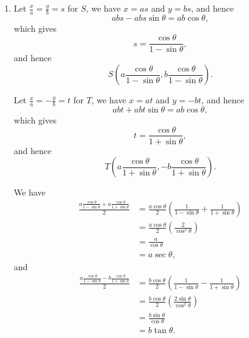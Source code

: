 \begin{enumerate}
    \item Let \(\frac{x}{a} = \frac{y}{b} = s\) for \(S\), we have \(x = as\) and \(y = bs\), and hence
          \[
              abs - abs \sin \theta = ab \cos \theta,
          \]
          which gives
          \[
              s = \frac{\cos \theta}{1 - \sin \theta},
          \]
          and hence
          \[
              S \left(a\frac{\cos \theta}{1 - \sin \theta}, b\frac{\cos \theta}{1 - \sin \theta}\right).
          \]

          Let \(\frac{x}{a} = - \frac{y}{b} = t\) for \(T\), we have \(x = at\) and \(y = -bt\), and hence
          \[
              abt + abt \sin \theta = ab \cos \theta,
          \]
          which gives
          \[
              t = \frac{\cos \theta}{1 + \sin \theta},
          \]
          and hence
          \[
              T \left(a\frac{\cos \theta}{1 + \sin \theta}, -b\frac{\cos \theta}{1 + \sin \theta}\right).
          \]

          We have
          \begin{align*}
              \frac{a\frac{\cos \theta}{1 - \sin \theta} + a\frac{\cos \theta}{1 + \sin \theta}}{2} & = \frac{a \cos \theta}{2} \left(\frac{1}{1 - \sin \theta} + \frac{1}{1 + \sin \theta}\right) \\
                                                                                                    & = \frac{a \cos \theta}{2} \left(\frac{2}{\cos^2 \theta}\right)                               \\
                                                                                                    & = \frac{a}{\cos \theta}                                                                      \\
                                                                                                    & = a \sec \theta,
          \end{align*}
          and
          \begin{align*}
              \frac{a\frac{\cos \theta}{1 - \sin \theta} - b\frac{\cos \theta}{1 + \sin \theta}}{2} & = \frac{b \cos \theta}{2} \left(\frac{1}{1 - \sin \theta} - \frac{1}{1 + \sin \theta}\right) \\
                                                                                                    & = \frac{b \cos \theta}{2} \left(\frac{2 \sin \theta}{\cos^2 \theta}\right)                   \\
                                                                                                    & = \frac{b \sin \theta}{\cos \theta}                                                          \\
                                                                                                    & = b \tan \theta.
          \end{align*}


\end{enumerate}
